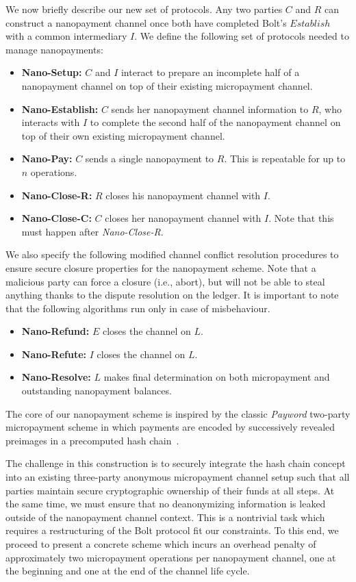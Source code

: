 We now briefly describe our new set of protocols.
Any two parties $C$ and $R$ can construct a nanopayment channel once both have completed Bolt's $Establish$ with a common intermediary $I$.
We define the following set of protocols needed to manage nanopayments:

\begin{itemize}
\item \textbf{Nano-Setup:} $C$ and $I$ interact to prepare an incomplete half of a nanopayment channel on top of their existing micropayment channel.
\item \textbf{Nano-Establish:} $C$ sends her nanopayment channel information to $R$, who interacts with $I$ to complete the second half of the nanopayment channel on top of their own existing micropayment channel.
\item \textbf{Nano-Pay:} $C$ sends a single nanopayment to $R$.
This is repeatable for up to $n$ operations.
\item \textbf{Nano-Close-R:} $R$ closes his nanopayment channel with $I$.
\item \textbf{Nano-Close-C:} $C$ closes her nanopayment channel with $I$.
Note that this must happen after \emph{Nano-Close-R}.
\end{itemize}

We also specify the following modified channel conflict resolution procedures to ensure secure closure properties for the nanopayment scheme.
Note that a
malicious party can force a closure (i.e., abort), but will not be able to steal anything thanks to the dispute resolution on the ledger.
It is important to note that the following algorithms run only in case of misbehaviour.

\begin{itemize}
\item \textbf{Nano-Refund:} $E$ closes the channel on $L$.
\item \textbf{Nano-Refute:} $I$ closes the channel on $L$.
\item \textbf{Nano-Resolve:} $L$ makes final determination on both micropayment
  and outstanding nanopayment balances.
\end{itemize}

The core of our nanopayment scheme is inspired by the classic \emph{Payword} two-party micropayment scheme in which payments are encoded by successively revealed preimages in a precomputed hash chain~\cite{rivest1996payword}.

The challenge in this construction is to securely integrate the hash chain concept into an existing three-party anonymous micropayment channel setup such that all parties maintain secure cryptographic ownership of their funds at all steps.
At the same time, we must ensure that no deanonymizing information is leaked outside of the nanopayment channel context.
This is a nontrivial task which requires a restructuring of the Bolt protocol fit our constraints.
To this end, we proceed to present a concrete scheme which incurs an overhead penalty of approximately two micropayment operations per nanopayment channel, one at the beginning and one at the end of the channel life cycle.

